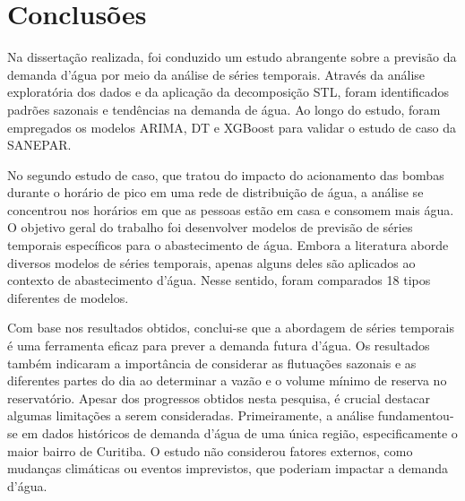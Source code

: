 \section{Conclus\~oes} \label{sec:conclusoes}

Na dissertação realizada, foi conduzido um estudo abrangente sobre a previsão da demanda d'água por meio da análise de séries temporais. Através da análise exploratória dos dados e da aplicação da decomposição STL, foram identificados padrões sazonais e tendências na demanda de água.
Ao longo do estudo, foram empregados os modelos ARIMA, DT e XGBoost para validar o estudo de caso da SANEPAR.

No segundo estudo de caso, que tratou do impacto do acionamento das bombas durante o horário de pico em uma rede de distribuição de água, a análise se concentrou nos horários em que as pessoas estão em casa e consomem mais água.
O objetivo geral do trabalho foi desenvolver modelos de previsão de séries temporais específicos para o abastecimento de água. Embora a literatura aborde diversos modelos de séries temporais, apenas alguns deles são aplicados ao contexto de abastecimento d'água. Nesse sentido, foram comparados 18 tipos diferentes de modelos.

Com base nos resultados obtidos, conclui-se que a abordagem de séries temporais é uma ferramenta eficaz para prever a demanda futura d'água. Os resultados também indicaram a importância de considerar as flutuações sazonais e as diferentes partes do dia ao determinar a vazão e o volume mínimo de reserva no reservatório.
Apesar dos progressos obtidos nesta pesquisa, é crucial destacar algumas limitações a serem consideradas. Primeiramente, a análise fundamentou-se em dados históricos de demanda d'água de uma única região, especificamente o maior bairro de Curitiba. O estudo não considerou fatores externos, como mudanças climáticas ou eventos imprevistos, que poderiam impactar a demanda d'água.





